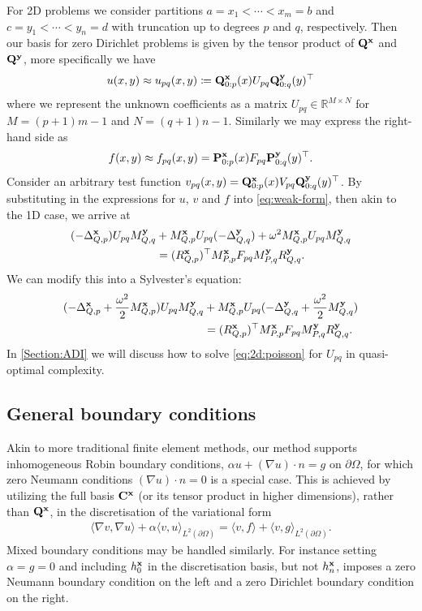 \documentclass[hidelinks,onefignum,onetabnum]{siamart220329}
\def\bfP{{\bf P}}
\def\bfC{{\bf C}}
\def\bfx{{\bf x}}
\def\bfy{{\bf y}}
\def\bfQ{{\bf Q}}
\def\bfQuptop{\bfQ_{0:p}}
\def\bfQuptoq{\bfQ_{0:q}}
\def\bfPuptop{\bfP_{0:p}}
\def\bfPuptoq{\bfP_{0:q}}
\def\bbR{{\mathbb R}}
\begin{document}
For 2D problems we consider partitions $a = x_1 < \cdots < x_m = b$ and $c = y_1 < \cdots < y_n = d$ with truncation up to degrees $p$ and $q$, respectively. Then our basis for zero Dirichlet problems is given by the tensor product of $\bfQ^\bfx$ and $\bfQ^\bfy$, more specifically we have
\[
	u(x,y) \approx u_{pq}(x,y) \coloneqq \bfQuptop^\bfx(x) U_{pq} \bfQuptoq^\bfy(y)^\top
\]
where we represent the unknown coefficients as a matrix $U_{pq} \in \bbR^{M \times N}$ for $M = (p+1) m-1$ and $N = (q+1) n-1$. Similarly we may express the right-hand side as
\[
	f(x,y) \approx f_{pq}(x,y) = \bfPuptop^\bfx(x) F_{pq} \bfPuptoq^\bfy(y)^\top.
\]
Consider an arbitrary test function $v_{pq}(x,y) = \bfQuptop^\bfx(x) V_{pq} \bfQuptoq^\bfy(y)^\top$. By substituting in the expressions for $u$, $v$ and $f$ into \cref{eq:weak-form}, then akin to the 1D case, we arrive at
\begin{align*}
(-\Delta_{Q,p}^\bfx) U_{pq} M_{Q,q}^\bfy &+ M_{Q,p}^\bfx U_{pq}   (-\Delta_{Q,q}^\bfy) + \omega^2 M_{Q,p}^\bfx U_{pq}  M_{Q,q}^\bfy  \notag\\
&= (R_{Q,p}^\bfx)^\top M_{P,p}^\bfx F_{pq} M_{P,q}^\bfy R_{Q,q}^\bfy.
\end{align*}
We can modify this into a Sylvester's equation:
\begin{align}
(-\Delta_{Q,p}^\bfx + {\omega^2 \over 2} M_{Q,p}^\bfx) U_{pq} M_{Q,q}^\bfy &+ M_{Q,p}^\bfx U_{pq}   (-\Delta_{Q,q}^\bfy + {\omega^2 \over 2} M_{Q,q}^\bfy)\notag\\
&= (R_{Q,p}^\bfx)^\top M_{P,p}^\bfx F_{pq} M_{P,q}^\bfy R_{Q,q}^\bfy.
\label{eq:2d:poisson}
\end{align}
In \cref{Section:ADI} we will discuss how to solve \cref{eq:2d:poisson} for $U_{pq}$ in quasi-optimal complexity.




\subsection{General boundary conditions}
Akin to more traditional finite element methods, our method supports inhomogeneous Robin boundary conditions, $\alpha u + (\nabla u) \cdot n = g$ on $\partial \Omega$, for which zero Neumann conditions $(\nabla u) \cdot n = 0$ is a special case. This is achieved by utilizing the full basis $\bfC^\bfx$ (or its tensor product in higher dimensions), rather than $\bfQ^\bfx$, in the discretisation of the variational form
\begin{align}
\langle \nabla v, \nabla u \rangle + \alpha \langle v, u \rangle_{L^2(\partial \Omega)} = \langle v, f \rangle + \langle v, g \rangle_{L^2(\partial \Omega)}.
\end{align}
Mixed boundary conditions may be handled similarly. For instance setting $\alpha = g=0$ and including $h_0^\bfx$ in the discretisation basis, but not $h_n^\bfx$, imposes a zero Neumann boundary condition on the left and a zero Dirichlet boundary condition on the right. 
\end{document}
